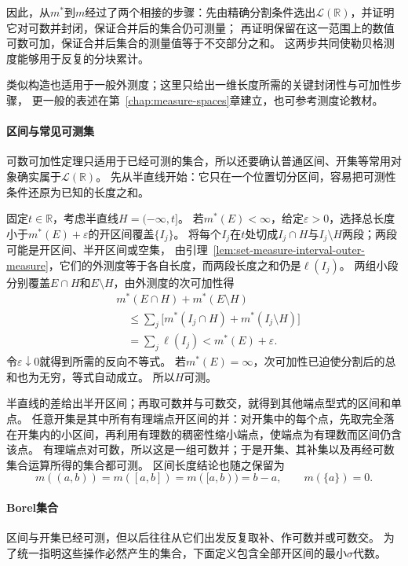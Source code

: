 因此，从$m^*$到$m$经过了两个相接的步骤：先由精确分割条件选出$\mathcal L(\mathbb R)$，并证明它对可数并封闭，保证合并后的集合仍可测量；
再证明保留在这一范围上的数值可数可加，保证合并后集合的测量值等于不交部分之和。
这两步共同使勒贝格测度能够用于反复的分块累计。

类似构造也适用于一般外测度；这里只给出一维长度所需的关键封闭性与可加性步骤，
更一般的表述在第~\ref{chap:measure-spaces}章建立，也可参考测度论教材。

\paragraph{区间与常见可测集}

可数可加性定理只适用于已经可测的集合，所以还要确认普通区间、开集等常用对象确实属于$\mathcal L(\mathbb R)$。
先从半直线开始：它只在一个位置切分区间，容易把可测性条件还原为已知的长度之和。

固定$t\in\mathbb R$，考虑半直线$H=(-\infty,t]$。
若$m^*(E)<\infty$，给定$\varepsilon>0$，选择总长度小于$m^*(E)+\varepsilon$的开区间覆盖$\{I_j\}$。
将每个$I_j$在$t$处切成$I_j\cap H$与$I_j\setminus H$两段；两段可能是开区间、半开区间或空集，
由引理~\ref{lem:set-measure-interval-outer-measure}，它们的外测度等于各自长度，而两段长度之和仍是$\ell(I_j)$。
两组小段分别覆盖$E\cap H$和$E\setminus H$，由外测度的次可加性得
\[
 \begin{aligned}
 &m^*(E\cap H)+m^*(E\setminus H)\\
 &\quad\leq\sum_j\bigl[m^*(I_j\cap H)+m^*(I_j\setminus H)\bigr]\\
 &\quad=\sum_j\ell(I_j)<m^*(E)+\varepsilon.
 \end{aligned}
\]
令$\varepsilon\downarrow0$就得到所需的反向不等式。
若$m^*(E)=\infty$，次可加性已迫使分割后的总和也为无穷，等式自动成立。
所以$H$可测。

半直线的差给出半开区间；再取可数并与可数交，就得到其他端点型式的区间和单点。
任意开集是其中所有有理端点开区间的并：对开集中的每个点，先取完全落在开集内的小区间，再利用有理数的稠密性缩小端点，使端点为有理数而区间仍含该点。
有理端点对可数，所以这是一组可数并；于是开集、其补集以及再经可数集合运算所得的集合都可测。
区间长度结论也随之保留为
\[
 m((a,b))=m([a,b])=m([a,b))=b-a,\qquad m(\{a\})=0.
\]

\paragraph{Borel集合}

区间与开集已经可测，但以后往往从它们出发反复取补、作可数并或可数交。
为了统一指明这些操作必然产生的集合，下面定义包含全部开区间的最小$\sigma$代数。

